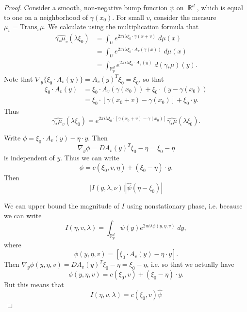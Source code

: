 \documentclass[dvipsnames,letterpaper,12pt]{article}
\DeclareMathOperator{\RR}{\mathbb{R}}
\begin{document}
\begin{proof}
    Consider a smooth, non-negative bump function $\psi$ on $\RR^d$, which is equal to one on a neighborhood of $\gamma(x_0)$. For small $v$, consider the measure $\mu_v = \text{Trans}_v \mu$. We calculate using the multiplication formula that
    \begin{align*}
        \widehat{\gamma_* \mu_v}(\lambda \xi_0) &= \int_U e^{2 \pi i \lambda \xi_0 \cdot \gamma(x + v)}\; d \mu(x)\\
        &= \int_U e^{2 \pi i \lambda \xi_0 \cdot A_v(\gamma(x))}\; d\mu(x)\\
        &= \int_{\RR^d_y} e^{2 \pi i \lambda \xi_0 \cdot A_v(y)}\; d(\gamma_* \mu)(y).
    \end{align*}
    Note that $\nabla_y \{ \xi_0 \cdot A_v(y) \} = A_v(y)^T \xi_0 = \xi_0$, so that
    \begin{align*}
        \xi_0 \cdot A_v(y) &= \xi_0 \cdot A_v(\gamma(x_0)) + \xi_0 \cdot (y - \gamma(x_0))\\
        &= \xi_0 \cdot [\gamma(x_0 + v) - \gamma(x_0)] + \xi_0 \cdot y.
    \end{align*}
    Thus
    \[ \widehat{\gamma_* \mu_v}(\lambda \xi_0) = e^{2 \pi i \lambda \xi_0 \cdot [\gamma(x_0 + v) - \gamma(x_0)]} \widehat{\gamma_* \mu}(\lambda \xi_0). \]



    Write $\phi = \xi_0 \cdot A_v(y) - \eta \cdot y$. Then
    \[ \nabla_y \phi = DA_v(y)^T \xi_0 - \eta = \xi_0 - \eta \]
    is independent of $y$. Thus we can write
    \[ \phi = c(\xi_0,v,\eta) + (\xi_0 - \eta) \cdot y. \]
    Then
    \[ |I(y,\lambda,\nu)| |\widehat{\psi}(\eta - \xi_0)| \]

    We can upper bound the magnitude of $I$ using nonstationary phase, i.e. because we can write
    \[ I(\eta,v,\lambda) = \int_{\RR^d_y} \psi(y) e^{2 \pi i \lambda \phi(y,\eta,v)}\; dy, \]
    where
    \[ \phi(y,\eta,v) = [\xi_0 \cdot A_v(y) - \eta \cdot y]. \]
    Then $\nabla_y \phi(y,\eta,v) = DA_v(y)^T \xi_0 - \eta = \xi_0 - \eta$, i.e. so that we actually have
    \[ \phi(y,\eta,v) = c(\xi_0,v) + (\xi_0 - \eta) \cdot y. \]
    But this means that
    \[ I(\eta,v,\lambda) = c(\xi_0,v) \widehat{\psi} \]


\end{proof}
\end{document}
